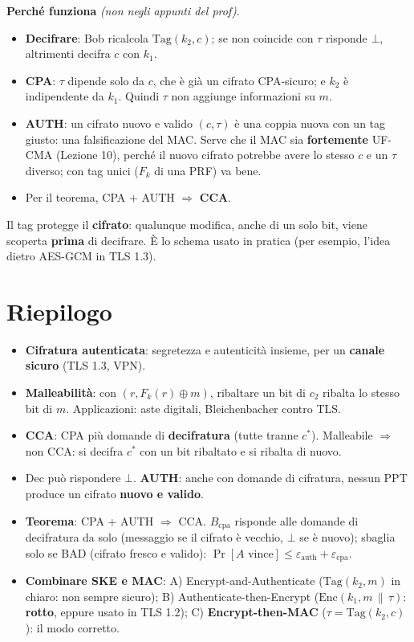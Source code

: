 \begin{nota}
\textbf{Perché funziona} \emph{(non negli appunti del prof)}.
\begin{itemize}
  \item \textbf{Decifrare}: Bob ricalcola \(\text{Tag}(k_2, c)\); se non coincide con \(\tau\) risponde \(\bot\), altrimenti decifra \(c\) con \(k_1\).
  \item \textbf{CPA}: \(\tau\) dipende solo da \(c\), che è già un cifrato CPA-sicuro; e \(k_2\) è indipendente da \(k_1\). Quindi \(\tau\) non aggiunge informazioni su \(m\).
  \item \textbf{AUTH}: un cifrato nuovo e valido \((c, \tau)\) è una coppia nuova con un tag giusto: una falsificazione del MAC. Serve che il MAC sia \textbf{fortemente} UF-CMA (Lezione 10), perché il nuovo cifrato potrebbe avere lo stesso \(c\) e un \(\tau\) diverso; con tag unici (\(F_k\) di una PRF) va bene.
  \item Per il teorema, CPA + AUTH \(\Rightarrow\) \textbf{CCA}.
\end{itemize}
Il tag protegge il \textbf{cifrato}: qualunque modifica, anche di un solo bit, viene scoperta \textbf{prima} di decifrare. È lo schema usato in pratica (per esempio, l'idea dietro AES-GCM in TLS 1.3).
\end{nota}

\section{Riepilogo}

\begin{itemize}
  \item \textbf{Cifratura autenticata}: segretezza e autenticità insieme, per un \textbf{canale sicuro} (TLS 1.3, VPN).
  \item \textbf{Malleabilità}: con \((r, F_k(r) \oplus m)\), ribaltare un bit di \(c_2\) ribalta lo stesso bit di \(m\). Applicazioni: aste digitali, Bleichenbacher contro TLS.
  \item \textbf{CCA}: CPA più domande di \textbf{decifratura} (tutte tranne \(c^*\)). Malleabile \(\Rightarrow\) non CCA: si decifra \(c^*\) con un bit ribaltato e si ribalta di nuovo.
  \item \(\text{Dec}\) può rispondere \(\bot\). \textbf{AUTH}: anche con domande di cifratura, nessun PPT produce un cifrato \textbf{nuovo e valido}.
  \item \textbf{Teorema}: CPA + AUTH \(\Rightarrow\) CCA. \(B_{\text{cpa}}\) risponde alle domande di decifratura da solo (messaggio se il cifrato è vecchio, \(\bot\) se è nuovo); sbaglia solo se BAD (cifrato fresco e valido): \(\Pr[A \text{ vince}] \le \varepsilon_{\text{auth}} + \varepsilon_{\text{cpa}}\).
  \item \textbf{Combinare SKE e MAC}: A) Encrypt-and-Authenticate (\(\text{Tag}(k_2, m)\) in chiaro: non sempre sicuro); B) Authenticate-then-Encrypt (\(\text{Enc}(k_1, m \,\|\, \tau)\): \textbf{rotto}, eppure usato in TLS 1.2); C) \textbf{Encrypt-then-MAC} (\(\tau = \text{Tag}(k_2, c)\)): il modo corretto.
\end{itemize}
